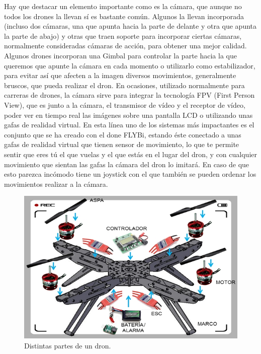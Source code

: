 Hay que destacar un elemento importante como es la cámara, que aunque no
todos los drones la llevan sí es bastante común. Algunos la llevan incorporada (incluso
dos cámaras, una que apunta hacia la parte de delante y otra que apunta la parte
de abajo) y otras que traen soporte para incorporar ciertas cámaras, normalmente
consideradas cámaras de acción, para obtener una mejor calidad. Algunos drones
incorporan una Gimbal para controlar la parte hacia la que queremos que apunte la
cámara en cada momento o utilizarlo como estabilizador, para evitar así que afecten a
la imagen diversos movimientos, generalmente bruscos, que pueda realizar el dron.
En ocasiones, utilizado normalmente para carreras de drones, la cámara sirve
para integrar la tecnología FPV (First Person View), que es junto a la cámara, el
transmisor de vídeo y el receptor de vídeo, poder ver en tiempo real las imágenes sobre
una pantalla LCD o utilizando unas gafas de realidad virtual. En esta línea uno de los
sistemas más impactantes es el conjunto que se ha creado con el done FLYBi, estando
éste conectado a unas gafas de realidad virtual que tienen sensor de movimiento, lo que
te permite sentir que eres tú el que vuelas y el que estás en el lugar del dron, y con
cualquier movimiento que sientan las gafas la cámara del dron lo imitará. En caso de
que esto parezca incómodo tiene un joystick con el que también se pueden ordenar los
movimientos realizar a la cámara.

\begin{figure}[H]
  \centering
  \includegraphics[scale=0.8]{imagenes/partesdron.jpg}
  \caption{Distintas partes de un dron.}
  \label{fig:gnat}
\end{figure}

